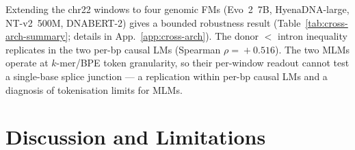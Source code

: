 \documentclass{article}
\theoremstyle{plain}
\theoremstyle{definition}
\theoremstyle{remark}
\begin{document}
Extending the chr22 windows to four genomic FMs (Evo~2~7B, HyenaDNA-large, NT-v2~500M, DNABERT-2) gives a bounded robustness result (Table~\ref{tab:cross-arch-summary}; details in App.~\ref{app:cross-arch}). The donor $<$ intron inequality replicates in the two per-bp causal LMs (Spearman $\rho\!=\!+0.516$). The two MLMs operate at $k$-mer/BPE token granularity, so their per-window readout cannot test a single-base splice junction --- a replication within per-bp causal LMs and a diagnosis of tokenisation limits for MLMs.

\begin{table}[t]
  \caption{Cross-model summary. Full per-window numbers and MLM tokenisation caveats are in App.~\ref{app:cross-arch}.}
  \label{tab:cross-arch-summary}
  \centering
  \footnotesize
  \setlength{\tabcolsep}{4pt}
\end{table}

\section{Discussion and Limitations}
\label{sec:discussion}
\end{document}
